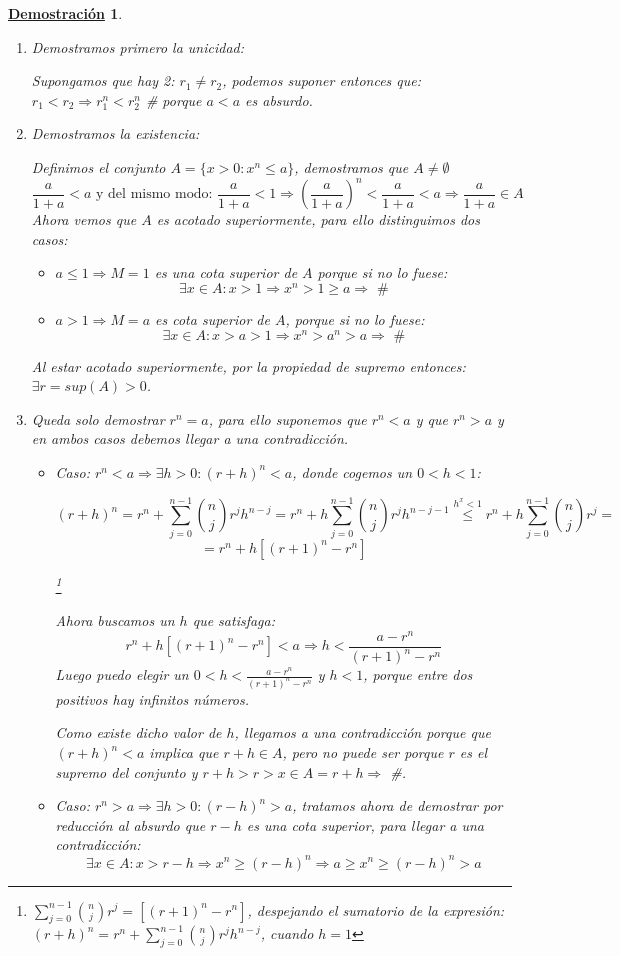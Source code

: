 \documentclass[10pt,a4paper,openright]{book}
\theoremstyle{break}
\newtheorem*{demo}{\underline{Demostración}}
\begin{document}
\begin{demo}
\begin{enumerate}
\item Demostramos primero la unicidad:\par
Supongamos que hay 2: $r_1\neq r_2$, podemos suponer entonces que: $r_1<r_2\Rightarrow r_1^n<r_2^n$ \# porque $a<a$ es absurdo.

\item Demostramos la existencia:\par 
Definimos el conjunto $A=\{x>0: x^n\leq a\}$, demostramos que $A\neq \emptyset$
$$\frac{a}{1+a}<a\mbox{ y del mismo modo: }\frac{a}{1+a}<1\Rightarrow \left(\frac{a}{1+a}\right)^n<\frac{a}{1+a}<a\Rightarrow \frac{a}{1+a}\in A$$
Ahora vemos que $A$ es acotado superiormente, para ello distinguimos dos casos:
	\begin{itemize}
	\item $a\leq 1\Rightarrow M=1$ es una cota superior de $A$ porque si no lo fuese:
$$\exists x\in A: x>1\Rightarrow x^n>1\geq a\Rightarrow \mbox{ \#}$$

	\item  $a>1\Rightarrow M=a$ es cota superior de $A$, porque si no lo fuese:
$$\exists x\in A: x>a>1 \Rightarrow x^n>a^n>a\Rightarrow\mbox{ \#}$$
	\end{itemize}

Al estar acotado superiormente, por la propiedad de supremo entonces: $\exists r=sup(A)>0$.
\item Queda solo demostrar $r^n=a$, para ello suponemos que $r^n<a$ y que $r^n>a$ y en ambos casos debemos llegar a una contradicción.
	\begin{itemize}
	\item Caso: $r^n<a\Rightarrow \exists h>0: (r+h)^n<a$, donde cogemos un $0<h<1$:
	
$$(r+h)^n=r^n+\sum_{j=0}^{n-1}\binom{n}{j}r^jh^{n-j}=r^n+h\sum_{j=0}^{n-1}\binom{n}{j}r^jh^{n-j-1}\stackrel{h^x<1}{\leq}r^n+h\sum_{j=0}^{n-1}\binom{n}{j}r^j=$$
$$=r^n+h\left[(r+1)^n-r^n\right]$$

\footnote{$\sum_{j=0}^{n-1}\binom{n}{j}r^j=\left[(r+1)^n-r^n\right]$, despejando el sumatorio de la expresión: $(r+h)^n=r^n+\sum_{j=0}^{n-1}\binom{n}{j}r^jh^{n-j}$, cuando $h=1$}

Ahora buscamos un $h$ que satisfaga:
$$r^n+h\left[(r+1)^n-r^n\right] <a \Rightarrow h<\frac{a-r^n}{(r+1)^n-r^n}$$
Luego puedo elegir un $0<h<\frac{a-r^n}{(r+1)^n-r^n}$ y $h<1$, porque entre dos positivos hay infinitos números.\par
Como existe dicho valor de $h$, llegamos a una contradicción porque que $(r+h)^n<a$ implica que $r+h\in A$, pero no puede ser porque $r$ es el supremo del conjunto y $r+h>r>x\in A=r+h\Rightarrow$ \#.
\vspace{0.5cm}
	\item Caso: $r^n>a\Rightarrow \exists h>0: (r-h)^n>a$, tratamos ahora de demostrar por reducción al absurdo que $r-h$ es una cota superior, para llegar a una contradicción:
$$\exists x\in A: x>r-h\Rightarrow x^n\geq (r-h)^n\Rightarrow a\geq x^n\geq (r-h)^n>a$$


\end{itemize}
\end{enumerate}
\end{demo}
\end{document}
